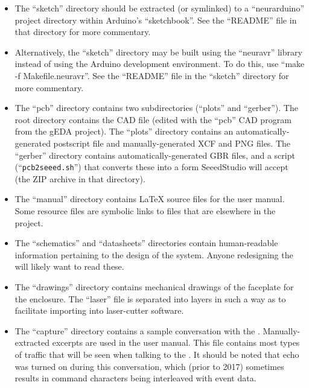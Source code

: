 \begin{itemize}
\item The ``sketch'' directory should be extracted (or symlinked) to a 
``neurarduino'' project directory within Arduino's ``sketchbook''. See the 
``README'' file in that directory for more commentary.

\item Alternatively, the ``sketch'' directory may be built using the
``neuravr'' library instead of using the Arduino development environment.
To do this, use ``make -f Makefile.neuravr''. See the ``README'' file in
the ``sketch'' directory for more commentary.

\item The ``pcb'' directory contains two subdirectories (``plots'' and 
``gerber''). The root directory contains the CAD file (edited with the 
``pcb'' CAD program from the gEDA project). The ``plots'' directory 
contains an automatically-generated postscript file and manually-generated 
XCF and PNG files. The ``gerber'' directory contains 
automatically-generated GBR files, and a script 
(``\texttt{pcb2seeed.sh}'') that converts these into a form SeeedStudio 
will accept (the ZIP archive in that directory).

\item The ``manual'' directory contains LaTeX source files for the user 
manual. Some resource files are symbolic links to files that are elsewhere 
in the project.

\item The ``schematics'' and ``datasheets'' directories contain 
human-readable information pertaining to the design of the {\projectname} 
system. Anyone redesigning the {\projectname} will likely want to read these.

\item The ``drawings'' directory contains mechanical drawings of the 
faceplate for the {\projectname} enclosure. The ``laser'' file is separated 
into layers in such a way as to facilitate importing into laser-cutter 
software.

\item The ``capture'' directory contains a sample conversation with the 
{\projectname}. Manually-extracted excerpts are used in the user manual. This 
file contains most types of traffic that will be seen when talking to the 
{\projectname}. It should be noted that echo was turned on during this 
conversation, which (prior to 2017) sometimes results in command characters
being interleaved with event data.
\end{itemize}

%
